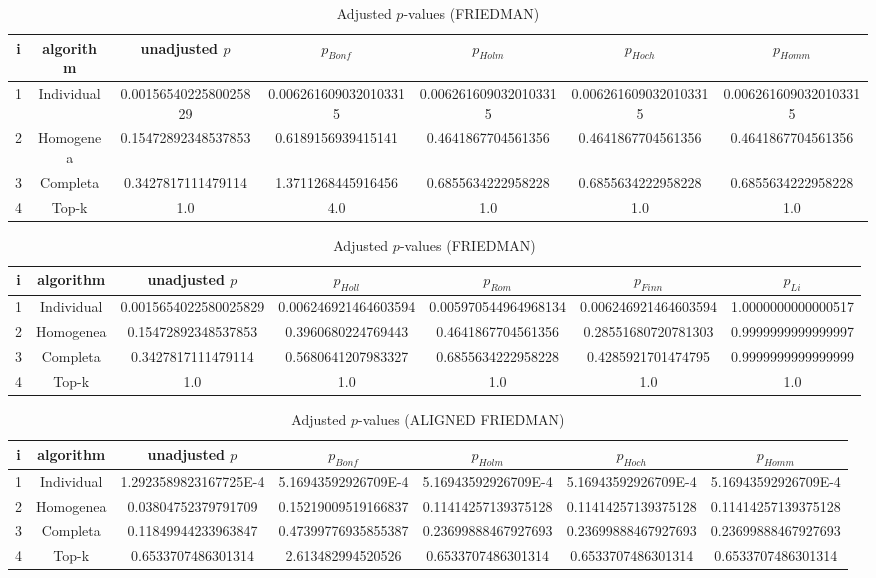 \documentclass[a4paper,10pt]{article}
\begin{document}
\begin{landscape}
\begin{table}[!htp]
\centering\scriptsize
\caption{Adjusted $p$-values (FRIEDMAN)}
\begin{tabular}{ccccccc}
i&algorithm&unadjusted $p$&$p_{Bonf}$&$p_{Holm}$&$p_{Hoch}$&$p_{Homm}$\\
\hline
1&Individual&0.0015654022580025829&0.0062616090320103315&0.0062616090320103315&0.0062616090320103315&0.0062616090320103315\\
2&Homogenea&0.15472892348537853&0.6189156939415141&0.4641867704561356&0.4641867704561356&0.4641867704561356\\
3&Completa&0.3427817111479114&1.3711268445916456&0.6855634222958228&0.6855634222958228&0.6855634222958228\\
4&Top-k&1.0&4.0&1.0&1.0&1.0\\
\hline
\end{tabular}
\end{table}

\begin{table}[!htp]
\centering\scriptsize
\caption{Adjusted $p$-values (FRIEDMAN)}
\begin{tabular}{ccccccc}
i&algorithm&unadjusted $p$&$p_{Holl}$&$p_{Rom}$&$p_{Finn}$&$p_{Li}$\\
\hline
1&Individual&0.0015654022580025829&0.006246921464603594&0.005970544964968134&0.006246921464603594&1.0000000000000517\\
2&Homogenea&0.15472892348537853&0.3960680224769443&0.4641867704561356&0.28551680720781303&0.9999999999999997\\
3&Completa&0.3427817111479114&0.5680641207983327&0.6855634222958228&0.4285921701474795&0.9999999999999999\\
4&Top-k&1.0&1.0&1.0&1.0&1.0\\
\hline
\end{tabular}
\end{table}


\newpage

\begin{table}[!htp]
\centering\scriptsize
\caption{Adjusted $p$-values (ALIGNED FRIEDMAN)}
\begin{tabular}{ccccccc}
i&algorithm&unadjusted $p$&$p_{Bonf}$&$p_{Holm}$&$p_{Hoch}$&$p_{Homm}$\\
\hline
1&Individual&1.2923589823167725E-4&5.16943592926709E-4&5.16943592926709E-4&5.16943592926709E-4&5.16943592926709E-4\\
2&Homogenea&0.03804752379791709&0.15219009519166837&0.11414257139375128&0.11414257139375128&0.11414257139375128\\
3&Completa&0.11849944233963847&0.47399776935855387&0.23699888467927693&0.23699888467927693&0.23699888467927693\\
4&Top-k&0.6533707486301314&2.613482994520526&0.6533707486301314&0.6533707486301314&0.6533707486301314\\
\hline
\end{tabular}
\end{table}


\end{landscape}
\end{document}
